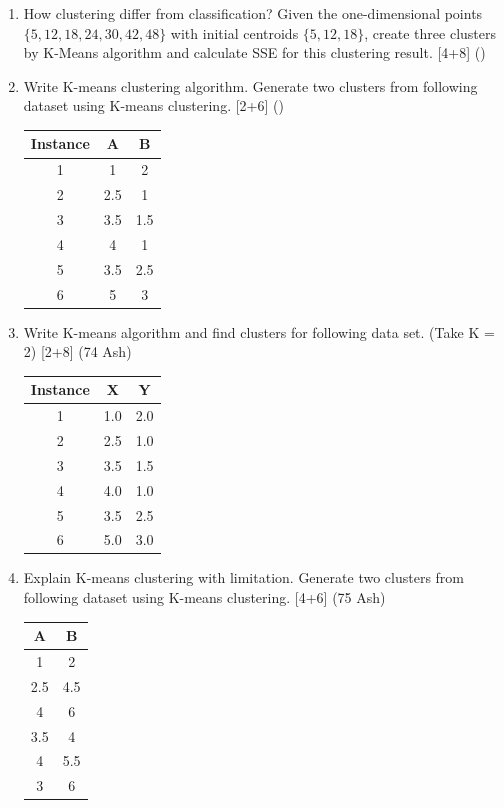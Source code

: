 \documentclass[12pt]{article}
\begin{document}
\begin{enumerate}[topsep=0pt, noitemsep]
      \item How clustering differ from classification? Given the one-dimensional points $\{5, 12, 18, 24, 30, 42, 48\}$ with initial centroids $\{5, 12, 18\}$, create three clusters by K-Means algorithm and calculate SSE for this clustering result. \hfill [4+8] ()

      \item Write K-means clustering algorithm. Generate two clusters from following dataset using K-means clustering. \hfill [2+6] ()\\
        \small
        \begin{tabular}{|c|c|c|}
          \hline
          Instance & A & B \\ \hline
          1 & 1 & 2 \\ \hline
          2 & 2.5 & 1 \\ \hline
          3 & 3.5 & 1.5 \\ \hline
          4 & 4 & 1 \\ \hline
          5 & 3.5 & 2.5 \\ \hline
          6 & 5 & 3 \\ \hline
        \end{tabular}
        \normalsize

      \item Write K-means algorithm and find clusters for following data set. (Take K = 2) \hfill [2+8] (74 Ash)\\
        \small
        \begin{tabular}{|c|c|c|}
          \hline
          Instance & X & Y \\ \hline
          1 & 1.0 & 2.0 \\ \hline
          2 & 2.5 & 1.0 \\ \hline
          3 & 3.5 & 1.5 \\ \hline
          4 & 4.0 & 1.0 \\ \hline
          5 & 3.5 & 2.5 \\ \hline
          6 & 5.0 & 3.0 \\ \hline
        \end{tabular}
        \normalsize

      \item Explain K-means clustering with limitation. Generate two clusters from following dataset using K-means clustering. \hfill [4+6] (75 Ash)\\
        \small
        \begin{tabular}{|c|c|}
          \hline
          A & B \\ \hline
          1 & 2 \\ \hline
          2.5 & 4.5 \\ \hline
          4 & 6 \\ \hline
          3.5 & 4 \\ \hline
          4 & 5.5 \\ \hline
          3 & 6 \\ \hline
        \end{tabular}
        \normalsize


\end{enumerate}
\end{document}
